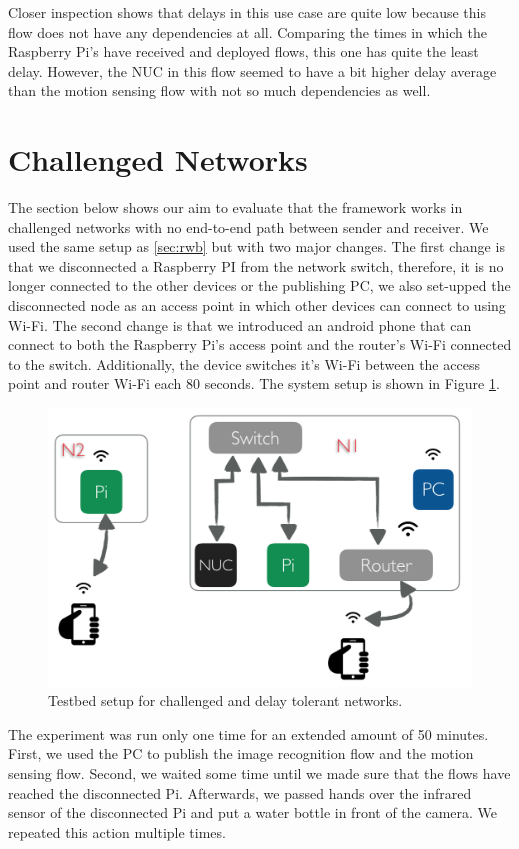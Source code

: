 \noindent Closer inspection shows that  delays in this use case are quite low because this flow does not have any dependencies at all. Comparing the times in which the Raspberry Pi's have received and deployed flows, this one  has quite the least delay. However, the NUC in this flow seemed to have a bit higher delay average than the motion sensing flow with not so much dependencies as well.


\section{Challenged Networks}
The section below shows our aim to evaluate that the framework works in challenged networks with no end-to-end path between  sender and receiver. We used the same setup as \ref{sec:rwb} but with two major changes. The first change is that we disconnected  a Raspberry PI from the network switch, therefore, it is no longer connected to the other devices or the publishing PC, we also set-upped the disconnected node as an access point in which other devices can connect to using Wi-Fi. The second change is that we introduced an android phone that can connect to both the Raspberry Pi's access point and the router's Wi-Fi connected to the switch. Additionally, the device switches it's Wi-Fi between the access point and router Wi-Fi each 80 seconds. The system setup is shown in Figure \ref{fig:tb-dtn}.
\begin{figure}[H]
	\centering
	\includegraphics[scale=0.6]{images/tb-dtn.png}
	\caption{Testbed setup for challenged and delay tolerant networks.}
	\label{fig:tb-dtn}
\end{figure} 

\noindent The experiment was run only one time for an extended amount of 50 minutes. First, we used the PC to publish the image recognition flow and the motion sensing flow. Second, we waited some time until we made sure that the flows have reached the disconnected Pi. Afterwards, we passed hands over the infrared sensor of the disconnected Pi and put a water bottle in front of the camera. We repeated this action multiple times.\\

